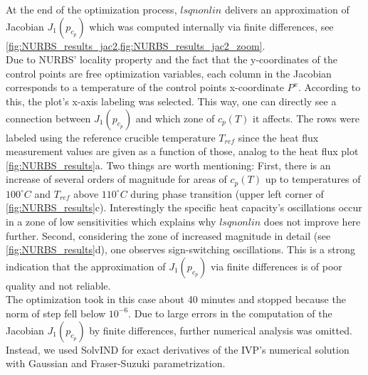 \documentclass{scrartcl}[12pt, halfparskip]
\numberwithin{equation}{section}
\numberwithin{figure}{section}
\numberwithin{table}{section}
\begin{document}
At the end of the optimization process, $lsqnonlin$ delivers an approximation of Jacobian $J_1(p_{c_p})$ which was computed internally via finite differences, see \cref{fig:NURBS_results_jac2,fig:NURBS_results_jac2_zoom}. \\
Due to NURBS' locality property and the fact that the y-coordinates of the control points are free optimization variables, each column in the Jacobian corresponds to a temperature of the control points x-coordinate $P^x$. 
According to this, the plot's x-axis labeling was selected.
This way, one can directly see a connection between $J_1(p_{c_p})$ and which zone of $c_p(T)$ it affects. 
The rows were labeled using the reference crucible temperature $T_{ref}$ since the heat flux measurement values are given as a function of those, analog to the heat flux plot \cref{fig:NURBS_results}a.
Two things are worth mentioning: 
First, there is an increase of several orders of magnitude for areas of $c_p(T)$ up to temperatures of $100^\circ C$ and $T_{ref}$ above $110^\circ C$ during phase transition (upper left corner of \cref{fig:NURBS_results}c). Interestingly the specific heat capacity's oscillations occur in a zone of low sensitivities which explains why $lsqnonlin$ does not improve here further. 
Second, considering the zone of increased magnitude in detail (see \cref{fig:NURBS_results}d), one observes sign-switching oscillations. This is a strong indication that the approximation of $J_1(p_{c_p})$ via finite differences is of poor quality and not reliable. \\
The optimization took in this case about 40 minutes and stopped because the norm of step fell below $10^{-6}$.
Due to large errors in the computation of the Jacobian $J_1(p_{c_p})$ by finite differences, further numerical analysis was omitted. Instead, we used SolvIND for exact derivatives of the IVP's numerical solution with Gaussian and Fraser-Suzuki parametrization.
\end{document}
